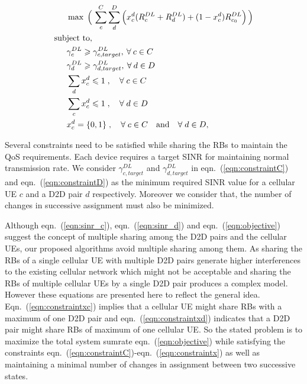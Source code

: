 \documentclass[times]{dacauth}
\begin{document}
\begin{align}
&\max \; \Big(\, \sum_{c}^{C}\sum_{d}^{D} \Big(x_{c}^{d} (R_{c}^{DL}+R_{d}^{DL}) + (1-x_{c}^{d}) R_{c_0}^{DL}\Big)\, \Big) \label{eqn:objective} \\
\text{sub}&\text{ject}\text{ to,}\notag\\
&\gamma_{c}^{DL} \geqslant \gamma_{c,target}^{DL}, \: \forall \:c\in C \label{eqn:constraintC} \\
&\gamma_{d}^{DL} \geqslant \gamma_{d,target}^{DL}, \: \forall \:d\in D \label{eqn:constraintD}\\
&\sum_{d}x_{c}^{d} \leqslant 1\;,\quad \forall \;c \in C \label{eqn:constraintxc}\\
&\sum_{c}x_{c}^{d} \leqslant 1\;,\quad \forall \;d \in D \label{eqn:constraintxd}\\
&x_{c}^{d} = \{0,1\}\;,  		 \quad \forall \;c \in C \quad  \text{and} \quad \forall \;d \in D, \label{eqn:constraintx}
\end{align}


\smallskip
\noindent
Several constraints need to be satisfied while sharing the RBs to maintain the QoS requirements. Each device requires a target SINR for maintaining normal transmission rate. We consider $\gamma_{c,target}^{DL}$ and $\gamma_{d,target}^{DL}$ in eqn.~(\ref{eqn:constraintC}) and eqn.~(\ref{eqn:constraintD}) as the minimum required SINR value for a cellular UE $c$ and a D2D pair $d$ respectively. Moreover we consider that, the number of changes in successive assignment must also be minimized.
 
\smallskip


\noindent
Although eqn.~(\ref{eqn:sinr_c}), eqn.~(\ref{eqn:sinr_d}) and eqn.~(\ref{eqn:objective}) suggest the concept of multiple sharing among the D2D pairs and the cellular UEs, our proposed algorithms avoid multiple sharing among them. As sharing the RBs of a single cellular UE with multiple D2D pairs generate higher interferences to the existing cellular network which might not be acceptable and sharing the RBs of multiple cellular UEs by a single D2D pair produces a complex model. However these equations are presented here to reflect the general idea. Eqn.~(\ref{eqn:constraintxc}) implies that a cellular UE might share RBs  with a maximum of one D2D pair and eqn.~(\ref{eqn:constraintxd}) indicates that a D2D pair might share RBs of maximum of one cellular UE. So the stated problem is to maximize the total system sumrate eqn.~(\ref{eqn:objective}) while satisfying the constraints eqn.~(\ref{eqn:constraintC})-eqn.~(\ref{eqn:constraintx}) as well as maintaining a minimal number of changes in assignment between two successive states. 
\end{document}
